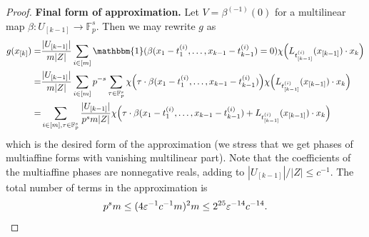 \documentclass[a4paper,11pt]{article}
\theoremstyle{definition}
\newcommand\id{\mathbbm{1}}
\begin{document}
\begin{proof}
    \noindent\textbf{Final form of approximation.} Let $V = \beta^{(-1)}(0)$ for a multilinear map $\beta: U_{[k-1]} \to \mathbb{F}_p^s$. Then we may rewrite $g$ as 
    \begin{align*}g(x_{[k]}) = &\frac{|U_{[k-1]}|}{m |Z|} \sum_{i \in [m]} \id(\beta(x_1 - t^{(i)}_1,\dots,x_{k-1} - t^{(i)}_{k-1}) = 0) \chi\Big(L_{t^{(i)}_{[k-1]}}(x_{[k-1]}) \cdot x_k\Big)\\
    = & \frac{|U_{[k-1]}|}{m |Z|} \sum_{i \in [m]} p^{-s}\sum_{\tau \in \mathbb{F}_p^s} \chi\Big(\tau\cdot \beta(x_1 - t^{(i)}_1,\dots,x_{k-1} - t^{(i)}_{k-1})\Big) \chi\Big(L_{t^{(i)}_{[k-1]}}(x_{[k-1]}) \cdot x_k\Big)\\
    = &  \sum_{i \in [m], \tau \in \mathbb{F}_p^s} \frac{|U_{[k-1]}|}{p^s m |Z|} \chi\Big(\tau\cdot \beta(x_1 - t^{(i)}_1,\dots,x_{k-1} - t^{(i)}_{k-1}) + L_{t^{(i)}_{[k-1]}}(x_{[k-1]}) \cdot x_k\Big)
    \end{align*}
    which is the desired form of the approximation (we stress that we get phases of multiaffine forms with vanishing multilinear part). Note that the coefficients of the multiaffine phases are nonnegative reals, adding to $|U_{[k-1]}| / |Z| \leq c^{-1}$. The total number of terms in the approximation is 
    \[p^s m \leq (4\varepsilon^{-1} c^{-1} m)^2 m \leq 2^{25}\varepsilon^{-14}c^{-14}.\qedhere\]
\end{proof}
\end{document}

